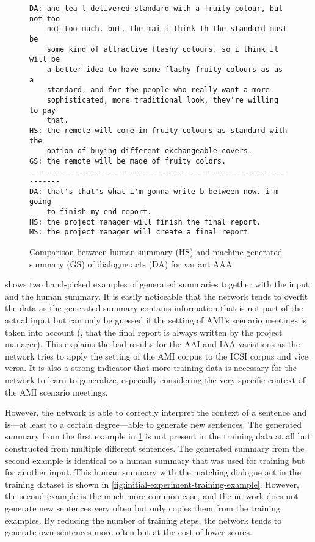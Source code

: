 \begin{figure}[h]
\begin{lstlisting}[numbers=none]
DA: and lea l delivered standard with a fruity colour, but not too
    not too much. but, the mai i think th the standard must be
    some kind of attractive flashy colours. so i think it will be 
    a better idea to have some flashy fruity colours as as a
    standard, and for the people who really want a more
    sophisticated, more traditional look, they're willing to pay
    that. 
HS: the remote will come in fruity colours as standard with the
    option of buying different exchangeable covers.
GS: the remote will be made of fruity colors.
------------------------------------------------------------------
DA: that's that's what i'm gonna write b between now. i'm going
    to finish my end report.
HS: the project manager will finish the final report.
MS: the project manager will create a final report
\end{lstlisting}
\caption[Comparison between human summary and machine-generated summary of dialogue acts for variant AAA]{Comparison between human summary (HS) and machine-generated summary (GS) of dialogue acts (DA) for variant AAA}
\label{fig:initial-experiment-example}
\end{figure}

 shows two hand-picked examples of generated summaries together with the input and the human summary.
It is easily noticeable that the network tends to overfit the data as the generated summary contains information that is not part of the actual input but can only be guessed if the setting of AMI's scenario meetings is taken into account (\eg, that the final report is always written by the project manager).
This explains the bad results for the AAI and IAA variations as the network tries to apply the setting of the AMI corpus to the ICSI corpus and vice versa.
It is also a strong indicator that more training data is necessary for the network to learn to generalize, especially considering the very specific context of the AMI scenario meetings.

However, the network is able to correctly interpret the context of a sentence and is---at least to a certain degree---able to generate new sentences.
The generated summary from the first example in \cref{fig:initial-experiment-example} is not present in the training data at all but constructed from multiple different sentences.
The generated summary from the second example is identical to a human summary that was used for training but for another input.
This human summary with the matching dialogue act in the training dataset is shown in \cref{fig:initial-experiment-training-example}.
However, the second example is the much more common case, and the network does not generate new sentences very often but only copies them from the training examples.
By reducing the number of training steps, the network tends to generate own sentences more often but at the cost of lower scores.

